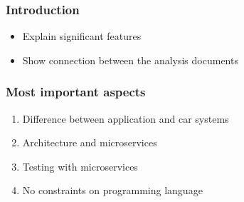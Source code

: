 \begin{frame}[t,plain]
    \titlepage
\end{frame}

\begin{frame}
    \frametitle{Introduction}
    \begin{itemize}
        \item Explain significant features
        \item Show connection between the analysis documents
    \end{itemize}
\end{frame}

\begin{frame}
	\frametitle{Most important aspects}
	\begin{enumerate}
		\item Difference between application and car systems
		\item Architecture and microservices
		\item Testing with microservices
		\item No constraints on programming language
	\end{enumerate}
\end{frame}
